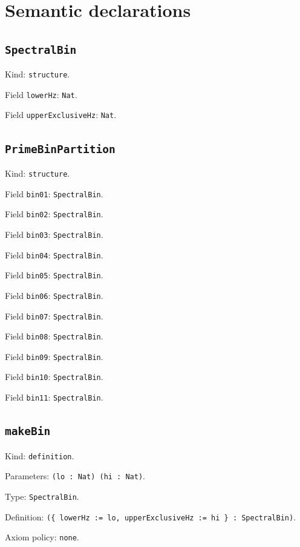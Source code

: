 \documentclass[11pt]{article}
\begin{document}
\section*{Semantic declarations}
\subsection*{\texttt{SpectralBin}}
\noindent Kind: \texttt{structure}.\par
\noindent Field \texttt{lowerHz}: \texttt{Nat}.\par
\noindent Field \texttt{upperExclusiveHz}: \texttt{Nat}.\par
\subsection*{\texttt{PrimeBinPartition}}
\noindent Kind: \texttt{structure}.\par
\noindent Field \texttt{bin01}: \texttt{SpectralBin}.\par
\noindent Field \texttt{bin02}: \texttt{SpectralBin}.\par
\noindent Field \texttt{bin03}: \texttt{SpectralBin}.\par
\noindent Field \texttt{bin04}: \texttt{SpectralBin}.\par
\noindent Field \texttt{bin05}: \texttt{SpectralBin}.\par
\noindent Field \texttt{bin06}: \texttt{SpectralBin}.\par
\noindent Field \texttt{bin07}: \texttt{SpectralBin}.\par
\noindent Field \texttt{bin08}: \texttt{SpectralBin}.\par
\noindent Field \texttt{bin09}: \texttt{SpectralBin}.\par
\noindent Field \texttt{bin10}: \texttt{SpectralBin}.\par
\noindent Field \texttt{bin11}: \texttt{SpectralBin}.\par
\subsection*{\texttt{makeBin}}
\noindent Kind: \texttt{definition}.\par
\noindent Parameters: \texttt{(lo : Nat) (hi : Nat)}.\par
\noindent Type: \texttt{SpectralBin}.\par
\noindent Definition: \texttt{(\{ lowerHz := lo, upperExclusiveHz := hi \} : SpectralBin)}.\par
\noindent Axiom policy: \texttt{none}.\par
\end{document}
